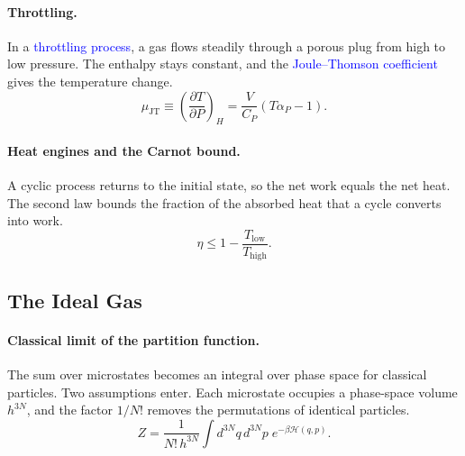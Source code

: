 \paragraph{Throttling.}
In a \textcolor{blue}{throttling process}, a gas flows steadily through a
porous plug from high to low pressure. The enthalpy stays constant, and the
\textcolor{blue}{Joule--Thomson coefficient} gives the temperature change.
\begin{equation}
    \boxed{\mu_{\text{JT}}\equiv\left(\frac{\partial T}{\partial P}\right)_{\!H}
    =\frac{V}{C_P}\left(T\alpha_P-1\right).}
\end{equation}

\paragraph{Heat engines and the Carnot bound.}
A cyclic process returns to the initial state, so the net work equals the
net heat. The second law bounds the fraction of the absorbed heat that a
cycle converts into work.
\begin{equation}
    \boxed{\eta\leq1-\frac{T_{\text{low}}}{T_{\text{high}}}.}
\end{equation}

\subsection{The Ideal Gas}

\paragraph{Classical limit of the partition function.}
The sum over microstates becomes an integral over phase space for classical
particles. Two assumptions enter. Each microstate occupies a phase-space
volume $h^{3N}$, and the factor $1/N!$ removes the permutations of identical
particles.
\begin{equation}
    \boxed{Z=\frac{1}{N!\,h^{3N}}\int d^{3N}q\,d^{3N}p\;e^{-\beta\mathcal{H}(q,p)}.}
\end{equation}

